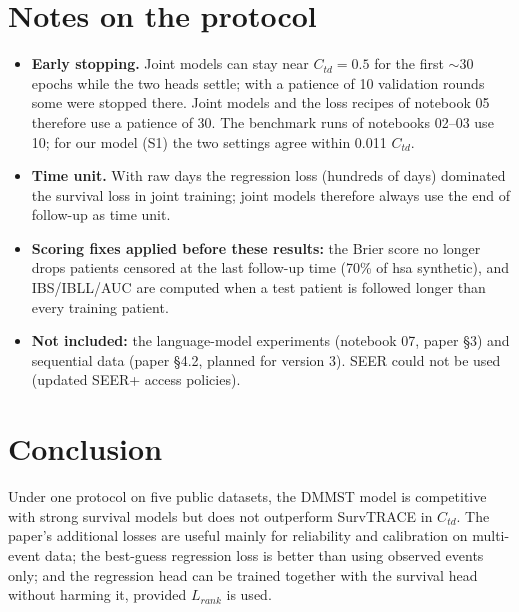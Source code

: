 \documentclass[11pt]{article}
\begin{document}
\section{Notes on the protocol}\label{sec:notes}
\begin{itemize}
  \item \textbf{Early stopping.} Joint models can stay near $C_{td}=0.5$ for the first $\sim$30 epochs
        while the two heads settle; with a patience of 10 validation rounds some were stopped there.
        Joint models and the loss recipes of notebook 05 therefore use a patience of 30. The benchmark
        runs of notebooks 02--03 use 10; for our model (S1) the two settings agree within 0.011 $C_{td}$.
  \item \textbf{Time unit.} With raw days the regression loss (hundreds of days) dominated the survival
        loss in joint training; joint models therefore always use the end of follow-up as time unit.
  \item \textbf{Scoring fixes applied before these results:} the Brier score no longer drops patients
        censored at the last follow-up time (70\% of hsa synthetic), and IBS/IBLL/AUC are computed when a
        test patient is followed longer than every training patient.
  \item \textbf{Not included:} the language-model experiments (notebook 07, paper \S3) and sequential
        data (paper \S4.2, planned for version 3). SEER could not be used (updated SEER+ access policies).
\end{itemize}

\section{Conclusion}
Under one protocol on five public datasets, the DMMST model is competitive with strong survival models
but does not outperform SurvTRACE in $C_{td}$. The paper's additional losses are useful mainly for
reliability and calibration on multi-event data; the best-guess regression loss is better than using
observed events only; and the regression head can be trained together with the survival head without
harming it, provided $L_{rank}$ is used.
\end{document}
